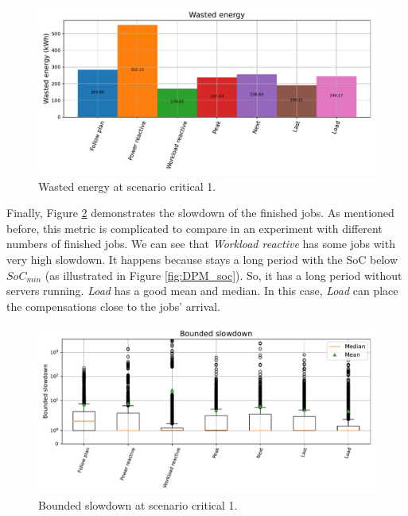 \begin{figure}[!htb]
    \centering
    \includegraphics[scale=0.55]{Images/Compensations/energy_critical_1.pdf}
    \caption{Wasted energy at scenario critical 1.}
    \label{fig:energy_critical_1}
\end{figure}

Finally, Figure \ref{fig:slowdown_critical_1} demonstrates the slowdown of the finished jobs. As mentioned before, this metric is complicated to compare in an experiment with different numbers of finished jobs. We can see that \emph{Workload reactive} has some jobs with very high slowdown. It happens because stays a long period with the SoC below $SoC_{min}$ (as illustrated in Figure \ref{fig:DPM_soc}). So, it has a long period without servers running. \emph{Load} has a good mean and median. In this case, \emph{Load} can place the compensations close to the jobs' arrival. 

\begin{figure}[!htb]
    \centering
    \includegraphics[scale=0.55]{Images/Compensations/slowdown_critical_1.pdf}
    \caption{Bounded slowdown at scenario critical 1.}
    \label{fig:slowdown_critical_1}
\end{figure}

\clearpage

